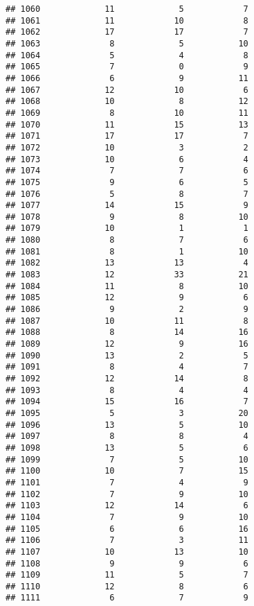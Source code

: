 \documentclass[
]{article}
\begin{document}
\begin{verbatim}
## 1060             11             5            7
## 1061             11            10            8
## 1062             17            17            7
## 1063              8             5           10
## 1064              5             4            8
## 1065              7             0            9
## 1066              6             9           11
## 1067             12            10            6
## 1068             10             8           12
## 1069              8            10           11
## 1070             11            15           13
## 1071             17            17            7
## 1072             10             3            2
## 1073             10             6            4
## 1074              7             7            6
## 1075              9             6            5
## 1076              5             8            7
## 1077             14            15            9
## 1078              9             8           10
## 1079             10             1            1
## 1080              8             7            6
## 1081              8             1           10
## 1082             13            13            4
## 1083             12            33           21
## 1084             11             8           10
## 1085             12             9            6
## 1086              9             2            9
## 1087             10            11            8
## 1088              8            14           16
## 1089             12             9           16
## 1090             13             2            5
## 1091              8             4            7
## 1092             12            14            8
## 1093              8             4            4
## 1094             15            16            7
## 1095              5             3           20
## 1096             13             5           10
## 1097              8             8            4
## 1098             13             5            6
## 1099              7             5           10
## 1100             10             7           15
## 1101              7             4            9
## 1102              7             9           10
## 1103             12            14            6
## 1104              7             9           10
## 1105              6             6           16
## 1106              7             3           11
## 1107             10            13           10
## 1108              9             9            6
## 1109             11             5            7
## 1110             12             8            6
## 1111              6             7            9

\end{verbatim}
\end{document}
